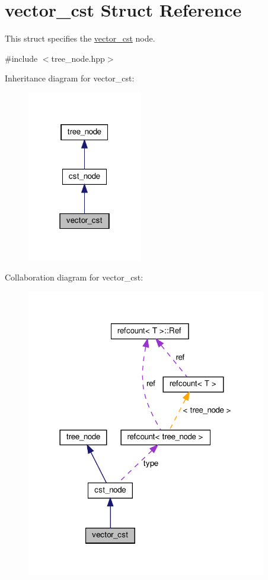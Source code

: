 \hypertarget{structvector__cst}{}\section{vector\+\_\+cst Struct Reference}
\label{structvector__cst}


This struct specifies the \hyperlink{structvector__cst}{vector\+\_\+cst} node.  




{\ttfamily \#include $<$tree\+\_\+node.\+hpp$>$}



Inheritance diagram for vector\+\_\+cst\+:
\nopagebreak
\begin{figure}[H]
\begin{center}
\leavevmode
\includegraphics[width=142pt]{d1/d82/structvector__cst__inherit__graph}
\end{center}
\end{figure}


Collaboration diagram for vector\+\_\+cst\+:
\nopagebreak
\begin{figure}[H]
\begin{center}
\leavevmode
\includegraphics[width=297pt]{dc/d10/structvector__cst__coll__graph}
\end{center}
\end{figure}
